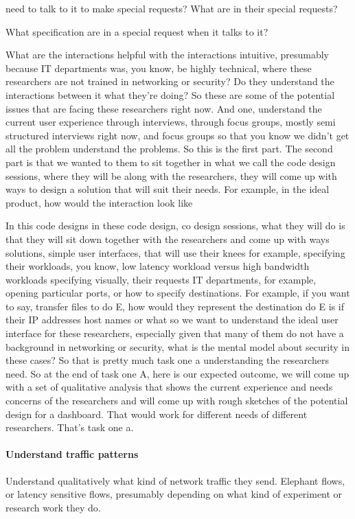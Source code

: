 need to talk to it to make special requests? What are in their special requests?

What specification are in a special request when it talks to it?

What are the interactions helpful with the interactions intuitive, presumably because IT departments was, you know, be highly technical, where these researchers are not trained in networking or security? Do they understand the interactions between it what they're doing? So these are some of the potential issues that are facing these researchers right now. And one, understand the current user experience through interviews, through focus groups, mostly semi structured interviews right now, and focus groups so that you know we didn't get all the problem understand the problems. So this is the first part. The second part is that we wanted to them to sit together in what we call the code design sessions, where they will be along with the researchers, they will come up with ways to design a solution that will suit their needs.
For example, in the ideal product, how would the interaction look like


In this code designs in these code design, co design sessions, what they will do is that they will sit down together with the researchers and come up with ways solutions, simple user interfaces, that will use their knees for example, specifying their workloads, you know, low latency workload versus high bandwidth workloads specifying visually, their requests IT departments, for example, opening particular ports, or how to specify destinations. For example, if you want to say, transfer files to do E, how would they represent the destination do E is if their IP addresses host names or what so we want to understand the ideal user interface for these researchers, especially given that many of them do not have a background in networking or security, what is the mental model about security in these cases? So that is pretty much task one a understanding the researchers need. So at the end of task one A, here is our expected outcome, we will come up with a set of qualitative analysis that shows the current experience and needs concerns of the researchers and will come up with rough sketches of the potential design for a dashboard. That would work for different needs of different researchers. That's task one a.




\paragraph{Understand traffic patterns}
Understand qualitatively what kind of network traffic they send. Elephant flows, or latency sensitive flows, presumably depending on what kind of experiment or research work they do.


